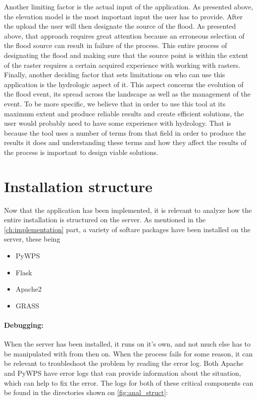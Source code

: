 Another limiting factor is the actual input of the application. As presented above, the elevation model is the most important input the user has to provide. After the upload the user will then designate the source of the flood. As presented above, that approach requires great attention because an erroneous selection of the flood source can result in failure of the process. This entire process of designating the flood and making sure that the source point is within the extent of the raster requires a certain acquired experience with working with rasters.
Finally, another deciding factor that sets limitations on who can use this application is the hydrologic aspect of it. This aspect concerns the evolution of the flood event, its spread across the landscape as well as the management of the event. To be more specific, we believe that in order to use this tool at its maximum extent and produce reliable results and create efficient solutions, the user would probably need to have some experience with hydrology. That is because the tool uses a number of terms from that field in order to produce the results it does and understanding these terms and how they affect the results of the process is important to design viable solutions.


\section{Installation structure}

Now that the application has been implemented, it is relevant to analyze how the entire installation is structured on the server. As mentioned in the \autoref{ch:implementation} part, a variety of softare packages have been installed on the server, these being 

\begin{itemize}
\item PyWPS
\item Flask
\item Apache2
\item GRASS
\end{itemize}

\paragraph{Debugging:} When the server has been installed, it runs on it's own, and not much else has to be manipulated with from then on. When the process fails for some reason, it can be relevant to troubleshoot the problem by reading the error log. Both Apache and PyWPS have error logs that can provide information about the situation, which can help to fix the error. The logs for both of these critical components can be found in the directories shown on \autoref{fig:anal_struct}:\\

